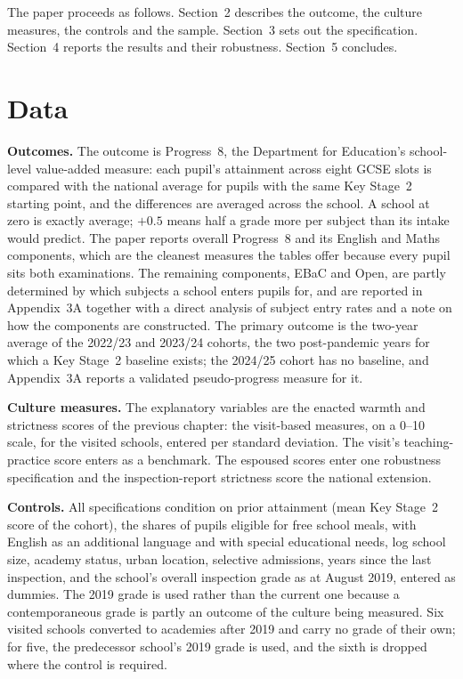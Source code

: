 The paper proceeds as follows. Section~2 describes the outcome, the culture
measures, the controls and the sample. Section~3 sets out the specification.
Section~4 reports the results and their robustness. Section~5 concludes.

\section{Data}
\label{sec:p2_data}

\textbf{Outcomes.} The outcome is Progress~8, the Department for Education's
school-level value-added measure: each pupil's attainment across eight GCSE
slots is compared with the national average for pupils with the same Key
Stage~2 starting point, and the differences are averaged across the school. A
school at zero is exactly average; $+0.5$ means half a grade more per subject
than its intake would predict. The paper reports overall Progress~8 and its
English and Maths components, which are the cleanest measures the tables offer
because every pupil sits both examinations. The remaining components, EBaC and
Open, are partly determined by which subjects a school enters pupils for, and
are reported in Appendix~3A together with a direct analysis of subject entry
rates and a note on how the components are constructed. The primary outcome is
the two-year average of the 2022/23 and 2023/24 cohorts, the two post-pandemic
years for which a Key Stage~2 baseline exists; the 2024/25 cohort has no
baseline, and Appendix~3A reports a validated pseudo-progress measure for it.

\textbf{Culture measures.} The explanatory variables are the enacted warmth
and strictness scores of the previous chapter: the visit-based measures, on a
0--10 scale, for the \NTierOne{} visited schools, entered per standard
deviation. The visit's teaching-practice score enters as a benchmark. The
espoused scores enter one robustness specification and the inspection-report
strictness score the national extension.

\textbf{Controls.} All specifications condition on prior attainment (mean Key
Stage~2 score of the cohort), the shares of pupils eligible for free school
meals, with English as an additional language and with special educational
needs, log school size, academy status, urban location, selective admissions,
years since the last inspection, and the school's overall inspection grade as
at August 2019, entered as dummies. The 2019 grade is used rather than the
current one because a contemporaneous grade is partly an outcome of the
culture being measured. Six visited schools converted to academies after 2019
and carry no grade of their own; for five, the predecessor school's 2019 grade
is used, and the sixth is dropped where the control is required.

